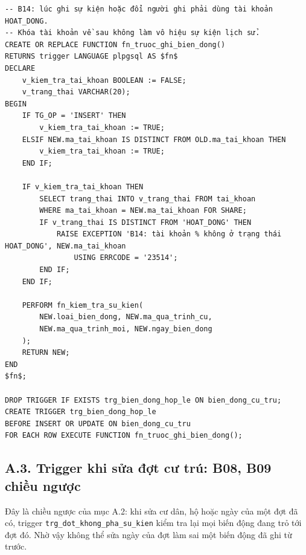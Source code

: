 \begin{lstlisting}[style=sqlvn, caption={Trigger khi ghi biến động: B08, B09 chiều thuận và B14}, label={lst:pl_bd}]
-- B14: lúc ghi sự kiện hoặc đổi người ghi phải dùng tài khoản HOAT_DONG.
-- Khóa tài khoản về sau không làm vô hiệu sự kiện lịch sử.
CREATE OR REPLACE FUNCTION fn_truoc_ghi_bien_dong()
RETURNS trigger LANGUAGE plpgsql AS $fn$
DECLARE
    v_kiem_tra_tai_khoan BOOLEAN := FALSE;
    v_trang_thai VARCHAR(20);
BEGIN
    IF TG_OP = 'INSERT' THEN
        v_kiem_tra_tai_khoan := TRUE;
    ELSIF NEW.ma_tai_khoan IS DISTINCT FROM OLD.ma_tai_khoan THEN
        v_kiem_tra_tai_khoan := TRUE;
    END IF;

    IF v_kiem_tra_tai_khoan THEN
        SELECT trang_thai INTO v_trang_thai FROM tai_khoan
        WHERE ma_tai_khoan = NEW.ma_tai_khoan FOR SHARE;
        IF v_trang_thai IS DISTINCT FROM 'HOAT_DONG' THEN
            RAISE EXCEPTION 'B14: tài khoản % không ở trạng thái HOAT_DONG', NEW.ma_tai_khoan
                USING ERRCODE = '23514';
        END IF;
    END IF;

    PERFORM fn_kiem_tra_su_kien(
        NEW.loai_bien_dong, NEW.ma_qua_trinh_cu,
        NEW.ma_qua_trinh_moi, NEW.ngay_bien_dong
    );
    RETURN NEW;
END
$fn$;

DROP TRIGGER IF EXISTS trg_bien_dong_hop_le ON bien_dong_cu_tru;
CREATE TRIGGER trg_bien_dong_hop_le
BEFORE INSERT OR UPDATE ON bien_dong_cu_tru
FOR EACH ROW EXECUTE FUNCTION fn_truoc_ghi_bien_dong();
\end{lstlisting}

\subsection*{A.3. Trigger khi sửa đợt cư trú: B08, B09 chiều ngược}

Đây là chiều ngược của mục A.2: khi sửa cư dân, hộ hoặc ngày của một đợt đã có, trigger \texttt{trg\_dot\_khong\_pha\_su\_kien} kiểm tra lại mọi biến động đang trỏ tới đợt đó. Nhờ vậy không thể sửa ngày của đợt làm sai một biến động đã ghi từ trước.

